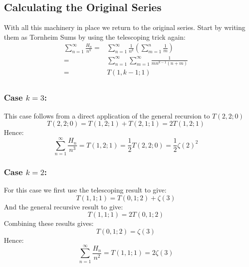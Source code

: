 \subsection{Calculating the Original Series}
With all this machinery in place we return to the original series.
Start by writing them as Tornheim Sums by using the telescoping trick again:
\begin{equation*}
\begin{aligned}
	\sum_{n=1}^\infty\frac{H_n}{n^k} =& \sum_{n=1}^\infty\frac{1}{n^k}\left(\sum_{m=1}^{n}\frac{1}{m}\right)\\
	=& \sum_{n=1}^\infty\sum_{m=1}^\infty\frac{1}{mn^{k-1}(n+m)}\\
	=& T(1,k-1;1)\\
\end{aligned}
\end{equation*}

\subsubsection{Case $k=3$:}
This case follows from a direct application of the general recursion to $T(2,2;0)$
\[T(2,2;0) = T(1,2;1)+T(2,1;1) = 2T(1,2;1)\]
Hence:
\[\sum_{n=1}^\infty\frac{H_n}{n^3} = T(1,2;1) = \frac{1}{2}T(2,2;0) = \frac{1}{2}\zeta(2)^2\]

\subsubsection{Case $k=2$:}
For this case we first use the telescoping result to give:
\[T(1,1;1) = T(0,1;2)+\zeta(3)\]
And the general recursive result to give:
\[T(1,1;1) = 2T(0,1;2)\]
Combining these results gives:
\[T(0,1;2) = \zeta(3)\]
Hence:
\[\sum_{n=1}^\infty\frac{H_n}{n^2} = T(1,1;1) = 2\zeta(3)\]

